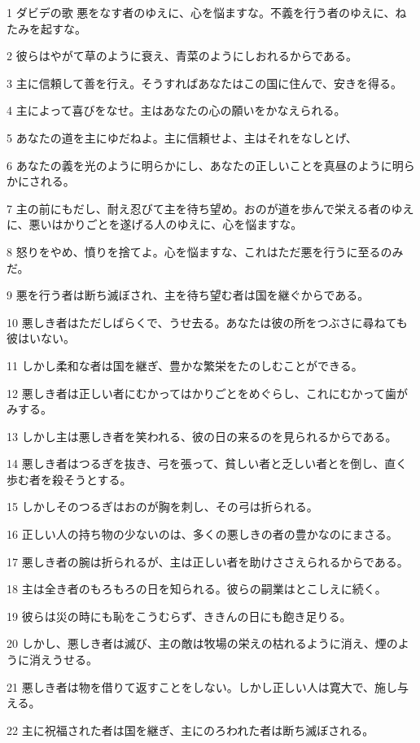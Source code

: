\par 1 ダビデの歌 悪をなす者のゆえに、心を悩ますな。不義を行う者のゆえに、ねたみを起すな。
\par 2 彼らはやがて草のように衰え、青菜のようにしおれるからである。
\par 3 主に信頼して善を行え。そうすればあなたはこの国に住んで、安きを得る。
\par 4 主によって喜びをなせ。主はあなたの心の願いをかなえられる。
\par 5 あなたの道を主にゆだねよ。主に信頼せよ、主はそれをなしとげ、
\par 6 あなたの義を光のように明らかにし、あなたの正しいことを真昼のように明らかにされる。
\par 7 主の前にもだし、耐え忍びて主を待ち望め。おのが道を歩んで栄える者のゆえに、悪いはかりごとを遂げる人のゆえに、心を悩ますな。
\par 8 怒りをやめ、憤りを捨てよ。心を悩ますな、これはただ悪を行うに至るのみだ。
\par 9 悪を行う者は断ち滅ぼされ、主を待ち望む者は国を継ぐからである。
\par 10 悪しき者はただしばらくで、うせ去る。あなたは彼の所をつぶさに尋ねても彼はいない。
\par 11 しかし柔和な者は国を継ぎ、豊かな繁栄をたのしむことができる。
\par 12 悪しき者は正しい者にむかってはかりごとをめぐらし、これにむかって歯がみする。
\par 13 しかし主は悪しき者を笑われる、彼の日の来るのを見られるからである。
\par 14 悪しき者はつるぎを抜き、弓を張って、貧しい者と乏しい者とを倒し、直く歩む者を殺そうとする。
\par 15 しかしそのつるぎはおのが胸を刺し、その弓は折られる。
\par 16 正しい人の持ち物の少ないのは、多くの悪しきの者の豊かなのにまさる。
\par 17 悪しき者の腕は折られるが、主は正しい者を助けささえられるからである。
\par 18 主は全き者のもろもろの日を知られる。彼らの嗣業はとこしえに続く。
\par 19 彼らは災の時にも恥をこうむらず、ききんの日にも飽き足りる。
\par 20 しかし、悪しき者は滅び、主の敵は牧場の栄えの枯れるように消え、煙のように消えうせる。
\par 21 悪しき者は物を借りて返すことをしない。しかし正しい人は寛大で、施し与える。
\par 22 主に祝福された者は国を継ぎ、主にのろわれた者は断ち滅ぼされる。
